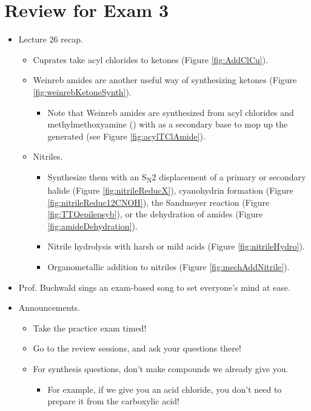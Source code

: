 \documentclass[../notes.tex]{subfiles}
\begin{document}
\section{Review for Exam 3}
\begin{itemize}
    \item {}Lecture 26 recap.
    \begin{itemize}
        \item Cuprates take acyl chlorides to ketones (Figure \ref{fig:AddClCu}).
        \item Weinreb amides are another useful way of synthesizing ketones (Figure \ref{fig:weinrebKetoneSynth}).
        \begin{itemize}
            \item Note that Weinreb amides are synthesized from acyl chlorides and methylmethoxyamine () with  as a secondary base to mop up the  generated (see Figure \ref{fig:acylTClAmide}).
        \end{itemize}
        \item Nitriles.
        \begin{itemize}
            \item Synthesize them with an S\textsubscript{N}2 displacement of a primary or secondary halide (Figure \ref{fig:nitrileReducX}), cyanohydrin formation (Figure \ref{fig:nitrileReduc12CNOH}), the Sandmeyer reaction (Figure \ref{fig:TTQepilepsyb}), or the dehydration of amides (Figure \ref{fig:amideDehydration}).
            \item Nitrile hydrolysis with harsh or mild acids (Figure \ref{fig:nitrileHydro}).
            \item Organometallic addition to nitriles (Figure \ref{fig:mechAddNitrile}).
        \end{itemize}
    \end{itemize}
    \item Prof. Buchwald sings an exam-based song to set everyone's mind at ease.
    \pagebreak
    \item Announcements.
    \begin{itemize}
        \item Take the practice exam timed!
        \item Go to the review sessions, and ask your questions there!
        \item For synthesis questions, don't make compounds we already give you.
        \begin{itemize}
            \item For example, if we give you an acid chloride, you don't need to prepare it from the carboxylic acid!

\end{itemize}
\end{itemize}
\end{itemize}
\end{document}
